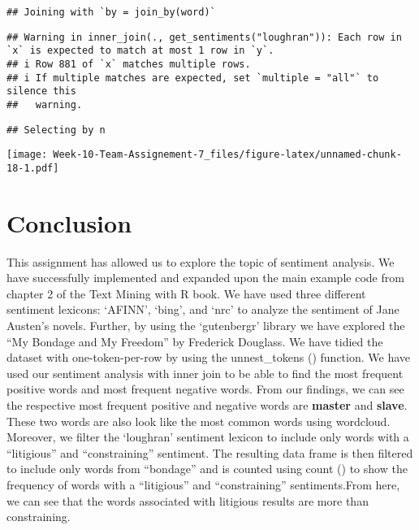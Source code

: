 \documentclass[
]{article}
\begin{document}
\begin{verbatim}
## Joining with `by = join_by(word)`
\end{verbatim}

\begin{verbatim}
## Warning in inner_join(., get_sentiments("loughran")): Each row in `x` is expected to match at most 1 row in `y`.
## i Row 881 of `x` matches multiple rows.
## i If multiple matches are expected, set `multiple = "all"` to silence this
##   warning.
\end{verbatim}

\begin{verbatim}
## Selecting by n
\end{verbatim}

\texttt{[image: Week-10-Team-Assignement-7\_files/figure-latex/unnamed-chunk-18-1.pdf]}

\hypertarget{conclusion}{%
\section{Conclusion}\label{conclusion}}

This assignment has allowed us to explore the topic of sentiment
analysis. We have successfully implemented and expanded upon the main
example code from chapter 2 of the Text Mining with R book. We have used
three different sentiment lexicons: `AFINN', `bing', and `nrc' to
analyze the sentiment of Jane Austen's novels. Further, by using the
`gutenbergr' library we have explored the ``My Bondage and My Freedom''
by Frederick Douglass. We have tidied the dataset with one-token-per-row
by using the unnest\_tokens () function. We have used our sentiment
analysis with inner join to be able to find the most frequent positive
words and most frequent negative words. From our findings, we can see
the respective most frequent positive and negative words are
\textbf{master} and \textbf{slave}. These two words are also look like
the most common words using wordcloud. Moreover, we filter the
`loughran' sentiment lexicon to include only words with a ``litigious''
and ``constraining'' sentiment. The resulting data frame is then
filtered to include only words from ``bondage'' and is counted using
count () to show the frequency of words with a ``litigious'' and
``constraining'' sentiments.From here, we can see that the words
associated with litigious results are more than constraining.
\end{document}
